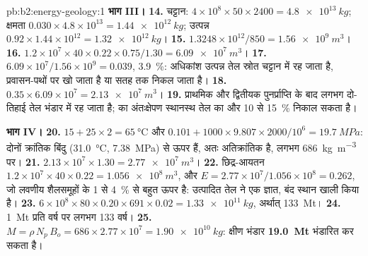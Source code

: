 \begin{solution}{pb:b2:energy-geology:1}
\noindent\textbf{भाग III।}
\textbf{14.} चट्टान: $4 \times 10^8 \times 50 \times 2400 = \qty{4.8e13}{kg}$; क्षमता $0.030
\times 4.8 \times 10^{13} = \qty{1.44e12}{kg}$; उत्पन्न $0.92 \times 1.44 \times 10^{12} =
\qty{1.32e12}{kg}$।
\textbf{15.} $1.3248 \times 10^{12}/850 = \qty{1.56e9}{m^3}$।
\textbf{16.} $1.2 \times 10^7 \times 40 \times 0.22 \times 0.75/1.30 = \qty{6.09e7}{m^3}$।
\textbf{17.} $6.09 \times 10^7/1.56 \times 10^9 = 0.039$, \qty{3.9}{\percent}: अधिकांश उत्पन्न तेल
स्रोत चट्टान में रह जाता है, प्रवासन-पथों पर खो जाता है या सतह तक निकल जाता है।
\textbf{18.} $0.35 \times 6.09 \times 10^7 = \qty{2.13e7}{m^3}$।
\textbf{19.} प्राथमिक और द्वितीयक पुनर्प्राप्ति के बाद लगभग दो-तिहाई तेल भंडार में रह जाता है;
 का अंतःक्षेपण स्थानस्थ तेल का और 10 से \qty{15}{\percent} निकाल सकता है।

\noindent\textbf{भाग IV।}
\textbf{20.} $15 + 25 \times 2 = \qty{65}{\celsius}$ और $0.101 + 1000 \times 9.807 \times 2000/10^6
= \qty{19.7}{MPa}$: दोनों क्रांतिक बिंदु (\qty{31.0}{\celsius}, \qty{7.38}{MPa}) से ऊपर हैं, अतः
 अतिक्रांतिक है, लगभग \qty{686}{kg.m^{-3}} पर।
\textbf{21.} $2.13 \times 10^7 \times 1.30 = \qty{2.77e7}{m^3}$।
\textbf{22.} छिद्र-आयतन $1.2 \times 10^7 \times 40 \times 0.22 = \qty{1.056e8}{m^3}$, और $E =
2.77 \times 10^7/1.056 \times 10^8 = 0.262$, जो लवणीय शैलसमूहों के 1 से \qty{4}{\percent} से बहुत ऊपर है:
उत्पादित तेल ने एक ज्ञात, बंद स्थान खाली किया है।
\textbf{23.} $6 \times 10^8 \times 80 \times 0.20 \times 691 \times 0.02 = \qty{1.33e11}{kg}$,
अर्थात् \qty{133}{Mt}।
\textbf{24.} \qty{1}{Mt} प्रति वर्ष पर लगभग 133 वर्ष।
\textbf{25.} $M = \rho\,N_p\,B_o = 686 \times 2.77 \times 10^7 = \qty{1.90e10}{kg}$: क्षीण
भंडार \textbf{\qty[text-series-to-math=true]{19.0}{Mt}}  भंडारित कर सकता है।
\end{solution}
